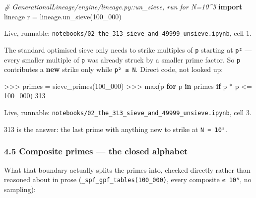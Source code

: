 \documentclass[
  10pt,
]{article}
\newenvironment{Shaded}{}{}
\newcommand{\BuiltInTok}[1]{\textcolor[rgb]{0.00,0.50,0.00}{#1}}
\newcommand{\CommentTok}[1]{\textcolor[rgb]{0.38,0.63,0.69}{\textit{#1}}}
\newcommand{\ControlFlowTok}[1]{\textcolor[rgb]{0.00,0.44,0.13}{\textbf{#1}}}
\newcommand{\DecValTok}[1]{\textcolor[rgb]{0.25,0.63,0.44}{#1}}
\newcommand{\ImportTok}[1]{\textcolor[rgb]{0.00,0.50,0.00}{\textbf{#1}}}
\newcommand{\KeywordTok}[1]{\textcolor[rgb]{0.00,0.44,0.13}{\textbf{#1}}}
\newcommand{\NormalTok}[1]{#1}
\newcommand{\OperatorTok}[1]{\textcolor[rgb]{0.40,0.40,0.40}{#1}}
\begin{document}
\begin{Shaded}
\begin{Highlighting}[]
\CommentTok{\# GenerationalLineage/engine/lineage.py::un\_sieve, run for N=10\^{}5}
\ImportTok{import}\NormalTok{ lineage}
\NormalTok{r }\OperatorTok{=}\NormalTok{ lineage.un\_sieve(}\DecValTok{100\_000}\NormalTok{)}
\end{Highlighting}
\end{Shaded}

Live, runnable:
\texttt{notebooks/02\_the\_313\_sieve\_and\_49999\_unsieve.ipynb}, cell
1.

The standard optimised sieve only needs to strike multiples of
\texttt{p} starting at \texttt{p²} --- every smaller multiple of
\texttt{p} was already struck by a smaller prime factor. So \texttt{p}
contributes a \textbf{new} strike only while \texttt{p²\ ≤\ N}. Direct
code, not looked up:

\begin{Shaded}
\begin{Highlighting}[]
\OperatorTok{\textgreater{}\textgreater{}\textgreater{}}\NormalTok{ primes }\OperatorTok{=}\NormalTok{ sieve\_primes(}\DecValTok{100\_000}\NormalTok{)}
\OperatorTok{\textgreater{}\textgreater{}\textgreater{}} \BuiltInTok{max}\NormalTok{(p }\ControlFlowTok{for}\NormalTok{ p }\KeywordTok{in}\NormalTok{ primes }\ControlFlowTok{if}\NormalTok{ p }\OperatorTok{*}\NormalTok{ p }\OperatorTok{\textless{}=} \DecValTok{100\_000}\NormalTok{)}
\DecValTok{313}
\end{Highlighting}
\end{Shaded}

Live, runnable:
\texttt{notebooks/02\_the\_313\_sieve\_and\_49999\_unsieve.ipynb}, cell
3.

313 is the answer: the last prime with anything new to strike at
\texttt{N\ =\ 10⁵}.

\hypertarget{composite-primes-the-closed-alphabet}{%
\subsubsection{4.5 Composite primes --- the closed
alphabet}\label{composite-primes-the-closed-alphabet}}

What that boundary actually splits the primes into, checked directly
rather than reasoned about in prose
(\texttt{\_spf\_gpf\_tables(100\_000)}, every composite \texttt{≤\ 10⁵},
no sampling):
\end{document}
